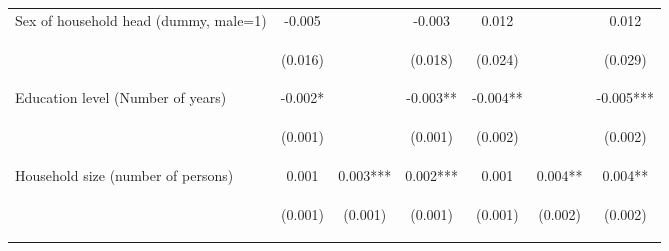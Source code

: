 \begin{center}
\begin{tabular}{lcccccc}
Sex of household head (dummy, male=1) & -0.005 &  & -0.003 & 0.012 &  & 0.012 \\
\vspace{4pt} & \begin{footnotesize}(0.016)\end{footnotesize} & \begin{footnotesize}\end{footnotesize} & \begin{footnotesize}(0.018)\end{footnotesize} & \begin{footnotesize}(0.024)\end{footnotesize} & \begin{footnotesize}\end{footnotesize} & \begin{footnotesize}(0.029)\end{footnotesize} \\
Education level (Number of years) & -0.002* &  & -0.003** & -0.004** &  & -0.005*** \\
\vspace{4pt} & \begin{footnotesize}(0.001)\end{footnotesize} & \begin{footnotesize}\end{footnotesize} & \begin{footnotesize}(0.001)\end{footnotesize} & \begin{footnotesize}(0.002)\end{footnotesize} & \begin{footnotesize}\end{footnotesize} & \begin{footnotesize}(0.002)\end{footnotesize} \\
Household size (number of persons) & 0.001 & 0.003*** & 0.002*** & 0.001 & 0.004** & 0.004** \\
\vspace{4pt} & \begin{footnotesize}(0.001)\end{footnotesize} & \begin{footnotesize}(0.001)\end{footnotesize} & \begin{footnotesize}(0.001)\end{footnotesize} & \begin{footnotesize}(0.001)\end{footnotesize} & \begin{footnotesize}(0.002)\end{footnotesize} & \begin{footnotesize}(0.002)\end{footnotesize} \\

\end{tabular}
\end{center}
